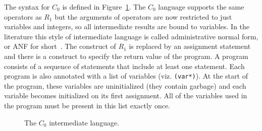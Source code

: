 \documentclass[11pt]{book}
\begin{document}
The syntax for $C_0$ is defined in Figure~\ref{fig:c0-syntax}.  The
$C_0$ language supports the same operators as $R_1$ but the arguments
of operators are now restricted to just variables and integers, so all
intermediate results are bound to variables. In the literature this
style of intermediate language is called administrative normal form,
or ANF for short~\citep{Danvy:1991fk,Flanagan:1993cg}.  The 
construct of $R_1$ is replaced by an assignment statement and there is
a  construct to specify the return value of the program. A
program consists of a sequence of statements that include at least one
 statement. Each program is also annotated with a list of
variables (viz. {\tt (var*)}). At the start of the program, these
variables are uninitialized (they contain garbage) and each variable
becomes initialized on its first assignment. All of the variables used
in the program must be present in this list exactly once.

\begin{figure}[tp]
\caption{The $C_0$ intermediate language.}
\label{fig:c0-syntax}
\end{figure}
\end{document}
